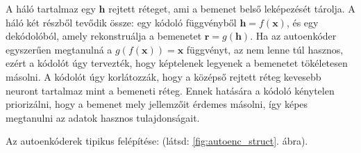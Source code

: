 


A háló tartalmaz egy $\textbf{h}$ rejtett réteget, ami a bemenet belső leképezését tárolja. A háló két részből tevődik össze: egy kódoló függvényből $\textbf{h} = f(\textbf{x})$, és egy dekódolóból, amely rekonstruálja a bemenetet $\textbf{r} = g(\textbf{h})$. Ha az autoenkóder egyszerűen megtanulná a $g(f(\textbf{x})) = \textbf{x}$ függvényt, az nem lenne túl hasznos, ezért a kódolót úgy tervezték, hogy képtelenek legyenek a bemenetet tökéletesen másolni. A kódolót úgy korlátozzák, hogy a középső rejtett réteg kevesebb neuront tartalmaz mint a bemeneti réteg. Ennek hatására a kódoló kénytelen priorizálni, hogy a bemenet mely jellemzőit érdemes másolni, így képes megtanulni az adatok hasznos tulajdonságait.

Az autoenkóderek tipikus felépítése: (látsd: \ref{fig:autoenc_struct}. ábra).

